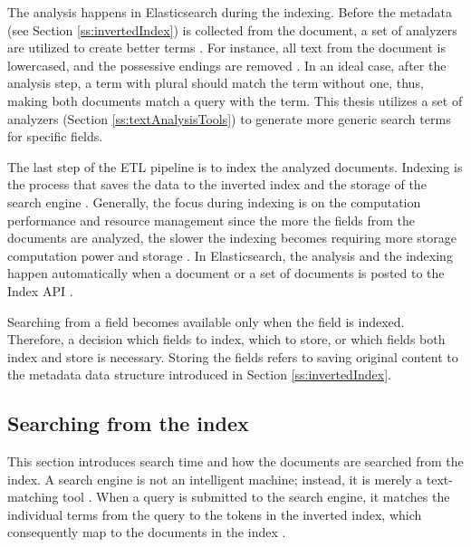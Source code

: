 The analysis happens in Elasticsearch during the indexing.
Before the metadata (see Section \ref{ss:invertedIndex}) is collected from the document, 
a set of analyzers are utilized to create better terms \cite{elasticIntro}.
For instance, all text from the document is lowercased, and the possessive endings are removed \cite{relevantSearch}.
In an ideal case, after the analysis step, a term with plural should match the term without one, thus, 
making both documents match a query with the term.
This thesis utilizes a set of analyzers (Section \ref{ss:textAnalysisTools}) to generate more generic search terms for specific fields.


The last step of the ETL pipeline is to index the analyzed documents.
Indexing is the process that saves the data to the inverted index and the storage of the search engine \cite{relevantSearch}.
Generally, the focus during indexing is on the computation performance and resource management
since the more the fields from the documents are analyzed, the slower the indexing becomes 
requiring more storage computation power and storage \cite{relevantSearch}.
In Elasticsearch, the analysis and the indexing happen automatically when 
a document or a set of documents is posted to the Index API \cite{elasticIntro}.


Searching from a field becomes available only when the field is indexed.
Therefore, a decision which fields to index, which to store, or which fields both index and store is necessary.
Storing the fields refers to saving original content to the metadata data structure introduced in Section \ref{ss:invertedIndex}.
\cite{relevantSearch}




\subsection{Searching from the index}
\label{ss:searchTime}

This section introduces search time and how the documents are searched from the index.
A search engine is not an intelligent machine; instead, it is merely a text-matching tool \cite{relevantSearch}. 
When a query is submitted to the search engine, it 
matches the individual terms from the query to the tokens in the inverted index, 
which consequently map to the documents in the index \cite{relevantSearch}. 

